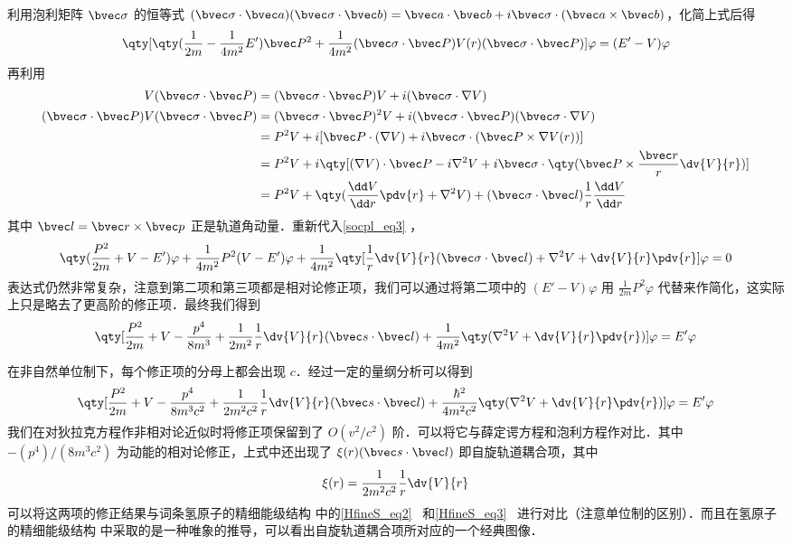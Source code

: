 利用泡利矩阵 $\bvec \sigma$ 的恒等式  $(\bvec \sigma\cdot \bvec a)(\bvec \sigma\cdot \bvec b)=\bvec a\cdot \bvec b+i\bvec \sigma\cdot (\bvec a\times \bvec b)$，化简上式后得
\begin{equation}\label{socpl_eq3}
\qty[\qty(\frac{1}{2m}-\frac{1}{4m^2}E')\bvec P^2+\frac{1}{4m^2}(\bvec \sigma\cdot \bvec P)V(r)(\bvec \sigma\cdot \bvec P)]\varphi=(E'-V)\varphi
\end{equation}
再利用
\begin{equation}
\begin{aligned}
V(\bvec \sigma\cdot \bvec P)&=(\bvec \sigma\cdot \bvec P)V+i (\bvec \sigma\cdot \nabla V)\\
(\bvec \sigma\cdot \bvec P)V(\bvec \sigma\cdot \bvec P)&=(\bvec \sigma\cdot \bvec P)^2 V+i (\bvec \sigma\cdot \bvec P)(\bvec \sigma\cdot \nabla V)\\
&=P^2 V+i [\bvec P\cdot (\nabla V)+i\bvec \sigma \cdot (\bvec P\times \nabla V(r))]\\
&=P^2V+i\qty[(\nabla V)\cdot \bvec P-i\nabla^2 V+i\bvec \sigma\cdot\qty(\bvec P\times \frac{\bvec r}{r}\dv{V}{r})]\\
&=P^2V+\qty(\frac{\dd V}{\dd r}\pdv{r} + \nabla^2 V)+(\bvec \sigma\cdot \bvec l)\frac{1}{r}\frac{\dd V}{\dd r}
\end{aligned}
\end{equation}
其中 $\bvec l=\bvec r\times \bvec p$ 正是轨道角动量．重新代入\autoref{socpl_eq3} ，
\begin{equation}
\qty(\frac{P^2}{2m}+V-E')\varphi+\frac{1}{4m^2}P^2(V-E')\varphi + \frac{1}{4m^2}\qty[\frac{1}{r}\dv{V}{r}(\bvec \sigma\cdot\bvec l)+\nabla^2 V+\dv{V}{r}\pdv{r}]\varphi = 0
\end{equation}
表达式仍然非常复杂，注意到第二项和第三项都是相对论修正项，我们可以通过将第二项中的 $(E'-V)\varphi$ 用 $\frac{1}{2m}P^2\varphi$ 代替来作简化，这实际上只是略去了更高阶的修正项．最终我们得到
\begin{equation}
\qty[\frac{P^2}{2m}+V-\frac{p^4}{8m^3}+\frac{1}{2m^2}\frac{1}{r}\dv{V}{r}(\bvec s\cdot \bvec l)+\frac{1}{4m^2}\qty(\nabla^2 V+\dv{V}{r}\pdv{r})]\varphi = E'\varphi
\end{equation}

在非自然单位制下，每个修正项的分母上都会出现 $c$．经过一定的量纲分析可以得到
\begin{equation}\label{socpl_eq4}
\qty[\frac{P^2}{2m}+V-\frac{p^4}{8m^3c^2}+\frac{1}{2m^2c^2}\frac{1}{r}\dv{V}{r}(\bvec s\cdot \bvec l)+\frac{\hbar^2}{4m^2c^2}\qty(\nabla^2 V+\dv{V}{r}\pdv{r})]\varphi = E'\varphi
\end{equation}
我们在对狄拉克方程作非相对论近似时将修正项保留到了 $O(v^2/c^2)$ 阶．可以将它与薛定谔方程和泡利方程作对比．其中 $-(p^4)/(8m^3c^2)$ 为动能的相对论修正，上式中还出现了 $\xi(r)(\bvec s\cdot \bvec l)$ 即自旋轨道耦合项，其中
\begin{equation}
\xi(r)=\frac{1}{2m^2c^2}\frac{1}{r}\dv{V}{r}
\end{equation}
可以将这两项的修正结果与词条氢原子的精细能级结构 中的\autoref{HfineS_eq2}~ 和\autoref{HfineS_eq3}~ 进行对比（注意单位制的区别）．而且在氢原子的精细能级结构 中采取的是一种唯象的推导，可以看出自旋轨道耦合项所对应的一个经典图像．

